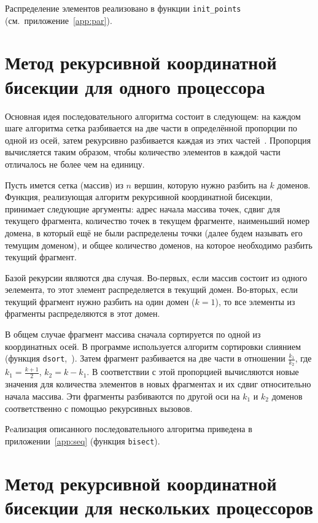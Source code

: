 \documentclass[oneside,final,14pt]{extreport}
\begin{document}
Распределение элементов реализовано в функции \texttt{init\_points}
(см.~приложение~\ref{app:par}).

\section*{Метод рекурсивной координатной бисекции для одного процессора}

Основная идея последовательного алгоритма состоит в следующем: на каждом
шаге алгоритма сетка разбивается на две части в определённой пропорции по
одной из осей, затем рекурсивно разбивается каждая из этих частей~\cite{baraban}.
Пропорция вычисляется таким образом, чтобы количество элементов в каждой
части отличалось не более чем на единицу.

Пусть имется сетка (массив) из $n$ вершин, которую нужно разбить на $k$ доменов.
Функция, реализующая алгоритм рекурсивной координатной бисекции, принимает
следующие аргументы: адрес начала массива точек, сдвиг для текущего фрагмента,
количество точек в текущем фрагменте, наименьший номер домена, в который ещё
не были распределены точки (далее будем называть его темущим доменом),
и общее количество доменов, на которое необходимо разбить текущий фрагмент.

Базой рекурсии являются два случая. Во-первых, если массив состоит из одного
эелемента, то этот элемент распределяется в текущий домен. Во-вторых,
если текущий фрагмент нужно разбить на один домен ($k = 1$), то все
элементы из фрагменты распределяются в этот домен.

В общем случае фрагмент массива сначала сортируется по одной из координатных
осей. В программе используется алгоритм сортировки слиянием (функция
\texttt{dsort},~\cite{sortbaraban}). Затем фрагмент разбивается на две части
в отношении
$\frac{k_1}{k_2}$, где $k_1 = \frac{k + 1}{2}$, $k_2 = k - k_1$.
В соответствии с этой пропорцией вычисляются новые значения для количества
элементов в новых фрагментах и их сдвиг относительно начала массива.
Эти фрагменты разбиваются по другой оси на $k_1$ и $k_2$ доменов соответственно
с помощью рекурсивных вызовов.

Рeализация описанного последовательного алгоритма приведена в
приложении~\ref{app:seq} (функция \texttt{bisect}).

\section*{Метод рекурсивной координатной бисекции для нескольких процессоров}
\end{document}
